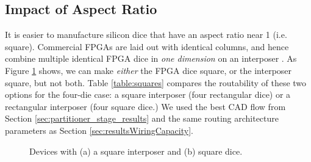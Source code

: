 \documentclass[journal]{IEEEtran}
\begin{document}
\subsection{Impact of Aspect Ratio}
\label{aspect_ratio_impact}
It is easier to manufacture silicon dice that have an aspect ratio near 1 (i.e. square). Commercial FPGAs are laid out with identical columns, and hence combine multiple identical FPGA dice in \textit{one dimension} on an interposer \cite{xilinxTSV}. As Figure \ref{fig:square_tall} shows, we can make \textit{either} the FPGA dice square, or the interposer square, but not both. Table \ref{table:squares} compares the routability of these two options for the four-die case: a square interposer (four rectangular dice) or a rectangular interposer (four square dice.) We used the best CAD flow from Section \ref{sec:partitioner_stage_results} and the same routing architecture parameters as Section \ref{sec:resultsWiringCapacity}. 

\begin{figure}[!htbp]
\centering
{}
\caption{Devices with (a) a square interposer and (b) square dice.}
\label{fig:square_tall}
\end{figure}
\end{document}
